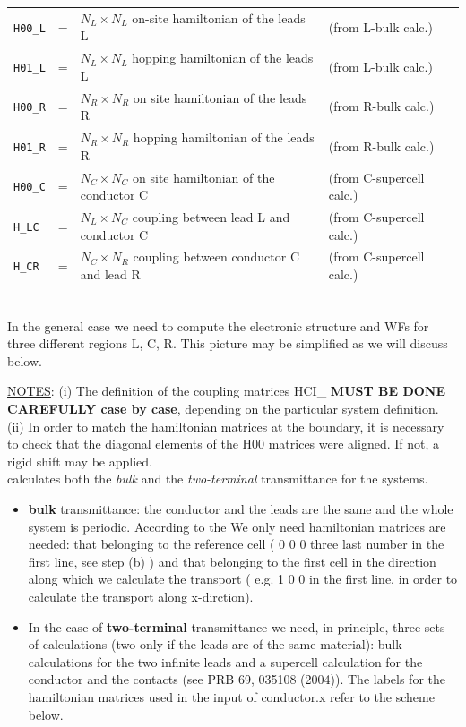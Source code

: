 %
%
\begin{tabular}{lllll}
\texttt{H00\_L} &=& $N_L\times N_L$ on-site hamiltonian
of the leads L & (from L-bulk calc.)\\
\texttt{H01\_L} &=& $N_L\times N_L$ hopping hamiltonian
of the leads L & (from L-bulk calc.) \\
\texttt{H00\_R} &=& $N_R\times N_R$ on site hamiltonian
of the leads R & (from R-bulk calc.) \\
\texttt{H01\_R} &=& $N_R\times N_R$ hopping hamiltonian
of the leads R & (from R-bulk calc.) \\
\texttt{H00\_C} &=& $N_C\times N_C$ on site hamiltonian
of the conductor C & (from C-supercell calc.) \\
\texttt{H\_LC}  &=& $N_L\times N_C$ coupling
between lead L and conductor C & (from C-supercell calc.) \\
\texttt{H\_CR}  &=& $N_C\times N_R$ coupling
between conductor C and lead R & (from C-supercell calc.)
%
%
\end{tabular}
%
%
\\

\noindent
In the general case we need to compute the electronic structure and
WFs for three different regions L, C, R.
This picture may be simplified as we will discuss below.


\noindent \underline{NOTES}: (i) The definition of the coupling
matrices HCI\_ {\bf MUST BE DONE CAREFULLY case by case},
depending on the particular system definition. (ii) In order to
match the hamiltonian matrices at the boundary, it is necessary to
check that the diagonal elements of the H00 matrices were aligned.
If not, a rigid shift may be applied. \\


 calculates both the {\em bulk} and the
{\em two-terminal} transmittance for the systems.
%
%
\begin{itemize}
\item {\bf bulk} transmittance: the conductor and the leads are
      the same and the whole system is periodic.
      According to the 
      We only need hamiltonian matrices are needed: that belonging to the
      reference cell ( 0 0 0 three last number in the first line, see
      step (b) ) and  that  belonging to the first
      cell in the direction along which we calculate the transport ( e.g.
      1 0 0 in the first line, in order to calculate the transport along
      x-dirction).

\item In the case of {\bf two-terminal} transmittance we need, in principle, 
      three sets of
      calculations (two only if the leads are of the same material): bulk
      calculations for the two infinite leads and a supercell calculation
      for the conductor and the contacts (see PRB 69, 035108 (2004)).
      The labels for the hamiltonian matrices used in the input of conductor.x 
      refer to the scheme below.
\end{itemize}
%
%
